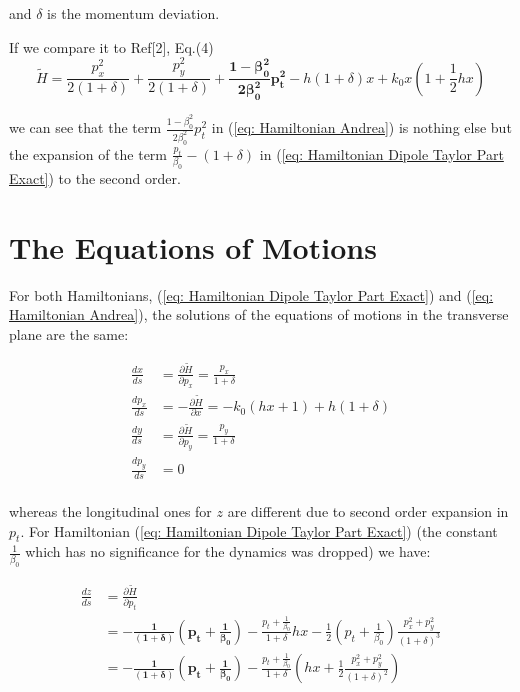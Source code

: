 \documentclass[12pt]{article}
\begin{document}
and $\delta$ is the momentum deviation. 

If we compare it to Ref[2], Eq.(4)
\begin{equation}
\label{eq: Hamiltonian Andrea}
\tilde{H} = \frac{p_{x}^{2}}{2(1+\delta)} + \frac{p_{y}^{2}}{2(1+\delta)} + \pmb{\frac{1-\beta_{0}^2}{2\beta_{0}^2}p_{t}^{2}} - h(1+\delta)x+k_{0}x\left(1+\frac{1}{2}hx\right)
\end{equation}

we can see that  the term $\frac{1-\beta_{0}^2}{2\beta_{0}^2}p_{t}^{2}$ in (\ref{eq: Hamiltonian Andrea}) is nothing else but the expansion of the term $\frac{p_{t}}{\beta_{0}} - (1+\delta)$  in (\ref{eq: Hamiltonian Dipole Taylor Part Exact}) to the second order.

\section{The Equations of Motions}

For both Hamiltonians, (\ref{eq: Hamiltonian Dipole Taylor Part Exact}) and (\ref{eq: Hamiltonian Andrea}), the solutions of the equations of motions in the transverse plane are the same:

\begin{align}
\frac{dx}{ds} &= \frac{\partial \tilde{H}}{\partial p_{x}} = \frac{p_{x}}{1+\delta} \nonumber \\
\frac{dp_{x}}{ds} &= -\frac{\partial \tilde{H}}{\partial x} = -k_{0}(hx+1)+h(1+\delta) \nonumber \\
\frac{dy}{ds} &= \frac{\partial \tilde{H}}{\partial p_{y}} = \frac{p_{y}}{1+\delta} \nonumber \\
\frac{dp_{y}}{ds} &= 0 \nonumber \\
\end{align}

whereas the longitudinal ones for $z$ are different due to second order expansion in $p_{t}$. For Hamiltonian (\ref{eq: Hamiltonian Dipole Taylor Part Exact}) (the constant $\frac{1}{\beta_{0}}$ which has no significance for the dynamics was dropped) we have:

\begin{align}
\frac{dz}{ds} &= \frac{\partial \tilde{H}}{\partial p_{t}} \nonumber \\
& = \pmb{-\frac{1}{(1+\delta)}\left(p_{t} +\frac{1}{\beta_{0}}  \right)}  - \frac{p_{t} + \frac{1}{\beta_{0}}}{1+\delta}hx  -   \frac{1}{2}\left(p_{t} + \frac{1}{\beta_{0}}\right)\frac{p_{x}^{2}+ p_{y}^{2}}{(1+\delta)^{3}}  \nonumber \\
&=\pmb{-\frac{1}{(1+\delta)}\left(p_{t} +\frac{1}{\beta_{0}}  \right)}  - \frac{p_{t} + \frac{1}{\beta_{0}}}{1+\delta}\left(hx  + \frac{1}{2}\frac{p_{x}^{2}+ p_{y}^{2}}{(1+\delta)^{2}}\right)
\label{eq: Motion Z}
\end{align}
\end{document}
